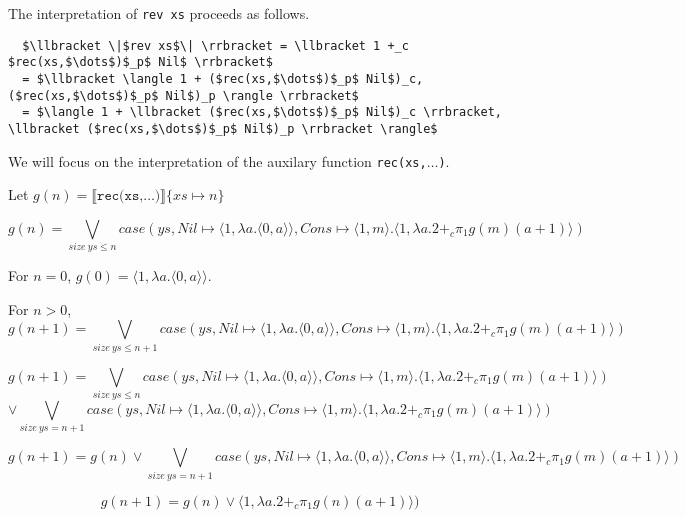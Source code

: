 \documentclass[12pt,letterpaper]{article}
\begin{document}
The interpretation of \texttt{rev xs} proceeds as follows.
\begin{lstlisting}
  $\llbracket \|$rev xs$\| \rrbracket = \llbracket 1 +_c $rec(xs,$\dots$)$_p$ Nil$ \rrbracket$
  = $\llbracket \langle 1 + ($rec(xs,$\dots$)$_p$ Nil$)_c, ($rec(xs,$\dots$)$_p$ Nil$)_p \rangle \rrbracket$
  = $\langle 1 + \llbracket ($rec(xs,$\dots$)$_p$ Nil$)_c \rrbracket, \llbracket ($rec(xs,$\dots$)$_p$ Nil$)_p \rrbracket \rangle$
\end{lstlisting}

We will focus on the interpretation of the auxilary function \texttt{rec(xs,$\dots$)}.

Let $g(n) = \llbracket \texttt{rec(xs,$\dots$)} \rrbracket \{xs \mapsto n\}$

\[g(n) = \bigvee_{size\ ys \leq n} case(ys, Nil \mapsto \langle1,\lambda a.\langle 0,a\rangle\rangle, Cons \mapsto \langle 1,m \rangle.\langle 1, \lambda a. 2 +_c \pi_1g(m) (a+1)\rangle)\]

For $n=0$, $g(0) = \langle 1,\lambda a.\langle 0,a\rangle\rangle$.

For $n>0$,
\[g(n+1) = \bigvee_{size\ ys \leq n+1} case(ys, Nil \mapsto \langle1,\lambda a.\langle 0,a\rangle\rangle, Cons \mapsto \langle 1,m \rangle.\langle 1, \lambda a. 2 +_c \pi_1g(m) (a+1)\rangle)\]

\[ g(n+1) = \bigvee_{size\ ys \leq n} case(ys, Nil \mapsto \langle1,\lambda a.\langle 0,a\rangle\rangle, Cons \mapsto \langle 1,m \rangle.\langle 1, \lambda a. 2 +_c \pi_1g(m) (a+1)\rangle) \]
\[ \vee \bigvee_{size\ ys = n+1} case(ys, Nil \mapsto \langle1,\lambda a.\langle 0,a\rangle\rangle, Cons \mapsto \langle 1,m \rangle.\langle 1, \lambda a. 2 +_c \pi_1g(m) (a+1)\rangle) \]
 
\[ g(n+1) = g(n) \vee \bigvee_{size\ ys = n+1} case(ys, Nil \mapsto \langle1,\lambda a.\langle 0,a\rangle\rangle, Cons \mapsto \langle 1,m \rangle.\langle 1, \lambda a. 2 +_c \pi_1g(m) (a+1)\rangle) \]

\[ g(n+1) = g(n) \vee \langle 1, \lambda a. 2 +_c \pi_1g(n) (a+1)\rangle)\]
\end{document}

